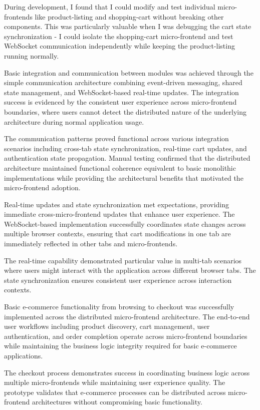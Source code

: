 \documentclass[12pt,a4paper]{report}
\begin{document}
During development, I found that I could modify and test individual micro-frontends like product-listing and shopping-cart without breaking other components. This was particularly valuable when I was debugging the cart state synchronization - I could isolate the shopping-cart micro-frontend and test WebSocket communication independently while keeping the product-listing running normally.

Basic integration and communication between modules was achieved through the simple communication architecture combining event-driven messaging, shared state management, and WebSocket-based real-time updates. The integration success is evidenced by the consistent user experience across micro-frontend boundaries, where users cannot detect the distributed nature of the underlying architecture during normal application usage.

The communication patterns proved functional across various integration scenarios including cross-tab state synchronization, real-time cart updates, and authentication state propagation. Manual testing confirmed that the distributed architecture maintained functional coherence equivalent to basic monolithic implementations while providing the architectural benefits that motivated the micro-frontend adoption.

Real-time updates and state synchronization met expectations, providing immediate cross-micro-frontend updates that enhance user experience. The WebSocket-based implementation successfully coordinates state changes across multiple browser contexts, ensuring that cart modifications in one tab are immediately reflected in other tabs and micro-frontends.

The real-time capability demonstrated particular value in multi-tab scenarios where users might interact with the application across different browser tabs. The state synchronization ensures consistent user experience across interaction contexts.

Basic e-commerce functionality from browsing to checkout was successfully implemented across the distributed micro-frontend architecture. The end-to-end user workflows including product discovery, cart management, user authentication, and order completion operate across micro-frontend boundaries while maintaining the business logic integrity required for basic e-commerce applications.

The checkout process demonstrates success in coordinating business logic across multiple micro-frontends while maintaining user experience quality. The prototype validates that e-commerce processes can be distributed across micro-frontend architectures without compromising basic functionality.
\end{document}
